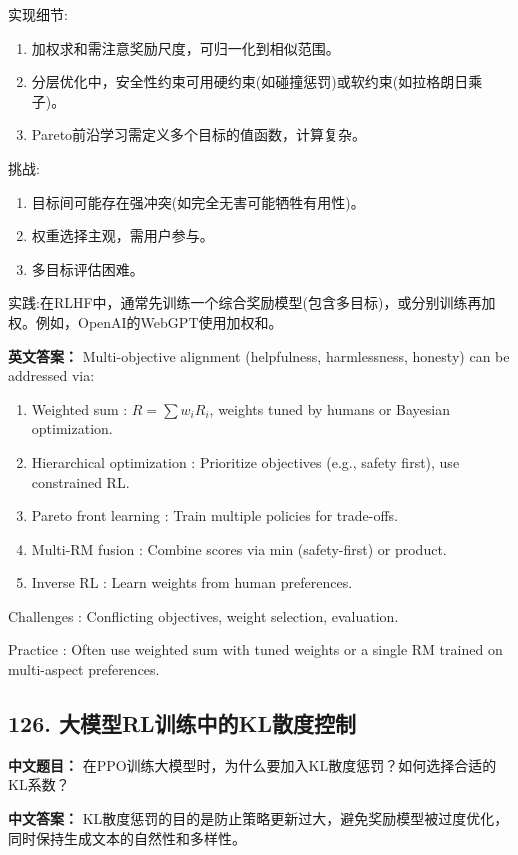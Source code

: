 \documentclass[10pt,a4paper]{ctexart}
\begin{document}
 实现细节:
\begin{enumerate}
    \item 加权求和需注意奖励尺度，可归一化到相似范围。
    \item 分层优化中，安全性约束可用硬约束(如碰撞惩罚)或软约束(如拉格朗日乘子)。
    \item Pareto前沿学习需定义多个目标的值函数，计算复杂。
\end{enumerate}

 挑战:
\begin{enumerate}
    \item 目标间可能存在强冲突(如完全无害可能牺牲有用性)。
    \item 权重选择主观，需用户参与。
    \item 多目标评估困难。
\end{enumerate}

 实践:在RLHF中，通常先训练一个综合奖励模型(包含多目标)，或分别训练再加权。例如，OpenAI的WebGPT使用加权和。

\textbf{英文答案：}  
Multi-objective alignment (helpfulness, harmlessness, honesty) can be addressed via:

\begin{enumerate}
    \item Weighted sum : \(R = \sum w_i R_i\), weights tuned by humans or Bayesian optimization.
    \item Hierarchical optimization : Prioritize objectives (e.g., safety first), use constrained RL.
    \item Pareto front learning : Train multiple policies for trade-offs.
    \item Multi-RM fusion : Combine scores via min (safety-first) or product.
    \item Inverse RL : Learn weights from human preferences.
\end{enumerate}

 Challenges : Conflicting objectives, weight selection, evaluation.

 Practice : Often use weighted sum with tuned weights or a single RM trained on multi-aspect preferences.

\subsection*{126. 大模型RL训练中的KL散度控制}
\textbf{中文题目：} 在PPO训练大模型时，为什么要加入KL散度惩罚？如何选择合适的KL系数？

\textbf{中文答案：}  
KL散度惩罚的目的是防止策略更新过大，避免奖励模型被过度优化，同时保持生成文本的自然性和多样性。
\end{document}
